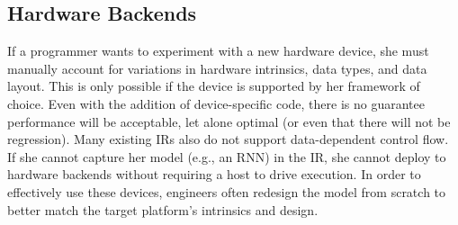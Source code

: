   \subsection{Hardware Backends}

If a programmer wants to experiment with a new hardware device,
  she must manually account for variations in hardware intrinsics, data
  types, and data layout.
This is only possible if the device is supported by her framework of choice.
Even with the addition of device-specific code,
  there is no guarantee performance will be acceptable, let alone optimal
  (or even that there will not be regression).
Many existing IRs also do not support data-dependent control flow.
If she cannot capture her model (e.g., an RNN) in the IR,
  she cannot deploy to hardware backends without requiring a host to drive
  execution.
In order to effectively use these devices,
  engineers often redesign the model from scratch to better match the target
  platform's intrinsics and design.


